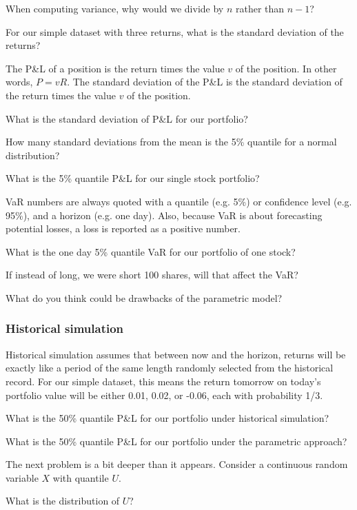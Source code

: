 \documentclass{report}
\numberwithin{problem}{chapter} %
\let\oldroblem\problem
\renewcommand{\problem}{ \oldroblem  \normalfont}
\newcommand{\vs}{\vspace}
\newcommand{\pnl}{P\&L }
\begin{document}
\problem When computing variance, why would we divide by $n$ rather than $n-1$?

\problem For our simple dataset with three returns, what is the standard deviation of the returns?

\vs{.5cm}

The \pnl of a \gls{position} is the return times the value $v$ of the position. In other words, $P = v R$. The standard deviation of the \pnl is the standard deviation of the return times the value $v$ of the position.

\problem What is the standard deviation of \pnl for our portfolio?

\problem How many standard deviations from the mean is the 5\% quantile for a normal distribution?

\problem What is the 5\% quantile \pnl for our single stock portfolio?

\gls{VaR} numbers are always quoted with a quantile (e.g. 5\%)  or confidence level (e.g. 95\%), and a horizon (e.g. one day). Also, because VaR is about forecasting potential losses, a loss is reported as a positive number. 

\problem What is the one day 5\% quantile VaR for our portfolio of one stock?

\problem If instead of long, we were short 100 shares, will that affect the VaR?

\problem What do you think could be drawbacks of the parametric model?

\subsubsection{Historical simulation}
Historical simulation assumes that between now and the horizon, returns will be exactly like a period of the same length randomly selected from the historical record. For our simple dataset, this means the return tomorrow on today's portfolio value will be either 0.01, 0.02, or -0.06, each with probability 1/3.

\problem What is the 50\% quantile \pnl for our portfolio under historical simulation? 

\problem What is the 50\% quantile \pnl for our portfolio under the parametric approach?

The next problem is a bit deeper than it appears. Consider a continuous random variable $X$ with quantile $U$. 

\problem What is the distribution of $U$? 
\end{document}
